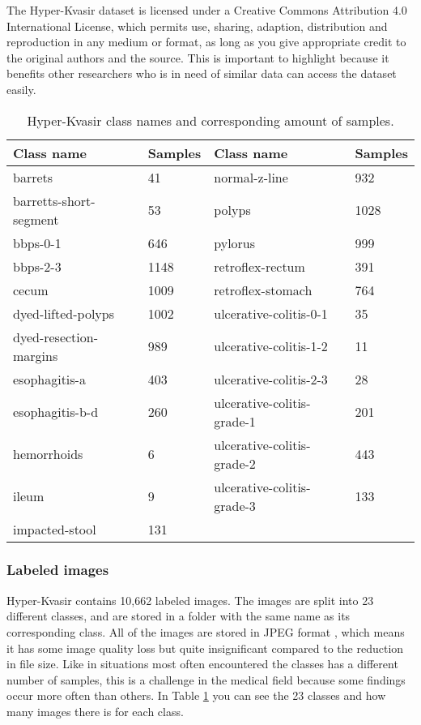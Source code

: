 \documentclass[thesis.tex]{subfiles}
\begin{document}
The Hyper-Kvasir dataset is licensed under a Creative Commons Attribution 4.0 International License, which permits use, sharing, adaption, distribution and reproduction in any medium or format, as long as you give appropriate credit to the original authors and the source. This is important to highlight because it benefits other researchers who is in need of similar data can access the dataset easily.

\begin{table} %
  \centering
  \begin{tabular}{|l|l|l|l|}
  	\hline
  	\textbf{Class name}		& \textbf{Samples}	& \textbf{Class name}		& \textbf{Samples} \\
    \hline
    barrets			& 41		& normal-z-line		& 932 \\ %
    barretts-short-segment & 53	& polyps			& 1028 \\ %
    bbps-0-1		& 646		& pylorus			& 999 \\ %
    bbps-2-3		& 1148		& retroflex-rectum	& 391 \\ %
    cecum			& 1009		& retroflex-stomach	& 764 \\ %
    dyed-lifted-polyps & 1002	& ulcerative-colitis-0-1 & 35 \\ %
    dyed-resection-margins & 989& ulcerative-colitis-1-2 & 11 \\ %
    esophagitis-a	& 403		& ulcerative-colitis-2-3 & 28 \\ %
    esophagitis-b-d	& 260		& ulcerative-colitis-grade-1 & 201 \\ %
    hemorrhoids		& 6			& ulcerative-colitis-grade-2 & 443 \\ %
    ileum			& 9			& ulcerative-colitis-grade-3 & 133 \\ %
    impacted-stool	& 131		& & \\ \hline
  \end{tabular}
  \caption{Hyper-Kvasir class names and corresponding amount of samples.}
  \label{table:hyper_kvasir}
\end{table}

\subsubsection{Labeled images}
Hyper-Kvasir contains 10,662 labeled images. The images are split into 23 different classes, and are stored in a folder with the same name as its corresponding class. All of the images are stored in JPEG format \cite{JPEGStill92}, which means it has some image quality loss but quite insignificant compared to the reduction in file size. Like in situations most often encountered the classes has a different number of samples, this is a challenge in the medical field because some findings occur more often than others. In Table \ref{table:hyper_kvasir} you can see the 23 classes and how many images there is for each class.
\end{document}
